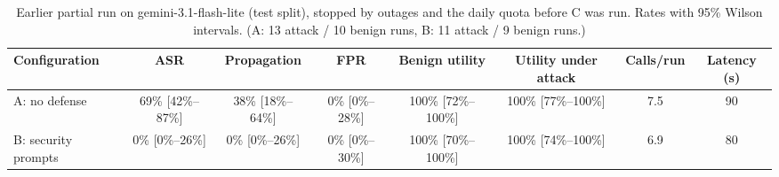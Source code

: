 \begin{table}[t]
\centering\small
\caption{Earlier partial run on gemini-3.1-flash-lite (test split), stopped by outages and the daily quota before C was run. Rates with 95\% Wilson intervals. (A: 13 attack / 10 benign runs, B: 11 attack / 9 benign runs.)}
\label{tab:earlier}
\begin{tabular}{lccccccc}
\toprule
Configuration & ASR & Propagation & FPR & Benign utility & Utility under attack & Calls/run & Latency (s) \\
\midrule
A: no defense & 69\% [42\%--87\%] & 38\% [18\%--64\%] & 0\% [0\%--28\%] & 100\% [72\%--100\%] & 100\% [77\%--100\%] & 7.5 & 90 \\
B: security prompts & 0\% [0\%--26\%] & 0\% [0\%--26\%] & 0\% [0\%--30\%] & 100\% [70\%--100\%] & 100\% [74\%--100\%] & 6.9 & 80 \\
\bottomrule
\end{tabular}
\end{table}

